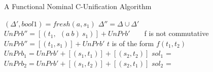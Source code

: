 \begin{frame}[allowframebreaks]{A Functional Nominal C-Unification Algorithm}
\begin{algorithmic}[1]
                    \State $(\Delta', bool1) =  fresh(a, s_1)$ 
                    \State $\Delta'' = \Delta \cup \Delta'$ 
                    \State $UnPrb'' = [(t_1, \ \ (a \ b) \ s_1)] + UnPrb'$ 
                        \State {}
                    \Else \ 
                    \EndIf
                \Else \ 
                \EndIf
             \Comment f is not commutative
                 
                \Else 
                    \State $UnPrb'' = [(t_1, s_1)] + UnPrb'$ 
                    \State {}
                \EndIf
            \Statex\Statex\Statex\Statex
            \Statex\Statex
            \Else \Comment $t$ is of the form $f(t_1, t_2)$
                 
                \Else
                    \State $UnPrb_1 = UnPrb' + [(s_1, t_1)] + [(s_2, t_2)]$
                    \State $sol_1$ = 
                    \State $UnPrb_2 = UnPrb' + [(s_1, t_2)] + [(s_2, t_1)]$
                    \State $sol_2$ = 
                    \State {}
                \EndIf
            \EndIf
        \EndIf
    \EndIf
\EndProcedure
\end{algorithmic}
\end{frame}
